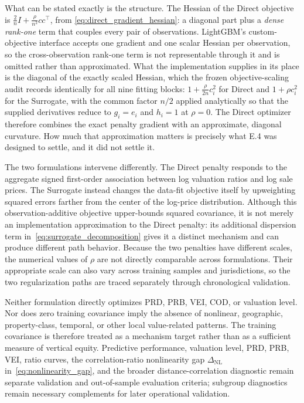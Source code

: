 \documentclass[10pt]{article}
\theoremstyle{definition}
\newcommand{\1}{\mathbf{1}}
\begin{document}
What can be stated exactly is the structure. The Hessian of the Direct
objective is $\frac{2}{n}I+\frac{\rho}{n^{2}}cc^{\top}$, from
\eqref{eq:direct_gradient_hessian}: a diagonal part plus a \emph{dense rank-one} term
that couples every pair of observations. LightGBM's custom-objective interface accepts
one gradient and one scalar Hessian per observation, so the cross-observation rank-one
term is not representable through it and is omitted rather than approximated. What the
implementation supplies in its place is the diagonal of the exactly scaled Hessian, which
the frozen objective-scaling audit records identically for all nine fitting blocks:
$1+\frac{\rho}{2n}c_i^{2}$ for Direct and $1+\rho c_i^{2}$ for the Surrogate, with the
common factor $n/2$ applied analytically so that the supplied derivatives reduce to
$g_i=e_i$ and $h_i=1$ at $\rho=0$. The Direct optimizer therefore combines the exact
penalty gradient with an approximate, diagonal curvature. How much that approximation
matters is precisely what E.4 was designed to settle, and it did not settle it.

{
The two formulations intervene differently. The Direct penalty responds to the aggregate signed first-order association between log valuation ratios and log sale prices. The Surrogate instead changes the data-fit objective itself by upweighting squared errors farther from the center of the log-price distribution. Although this observation-additive objective upper-bounds squared covariance, it is not merely an implementation approximation to the Direct penalty: its additional dispersion term in~\eqref{eq:surrogate_decomposition} gives it a distinct mechanism and can produce different path behavior. Because the two penalties have different scales, the numerical values of $\rho$ are not directly comparable across formulations. Their appropriate scale can also vary across training samples and jurisdictions, so the two regularization paths are traced separately through chronological validation.}


{Neither formulation directly optimizes PRD, PRB, VEI, COD, or valuation level. Nor does zero training covariance imply the absence of nonlinear, geographic, property-class, temporal, or other local value-related patterns. The training covariance is therefore treated as a mechanism target rather than as a sufficient measure of vertical equity. Predictive performance, valuation level, PRD, PRB, VEI, ratio curves, the correlation-ratio nonlinearity gap $\Delta_{\mathrm{NL}}$ in~\eqref{eq:nonlinearity_gap}, and the broader distance-correlation diagnostic remain separate validation and out-of-sample evaluation criteria; subgroup diagnostics remain necessary complements for later operational validation.}
\end{document}
